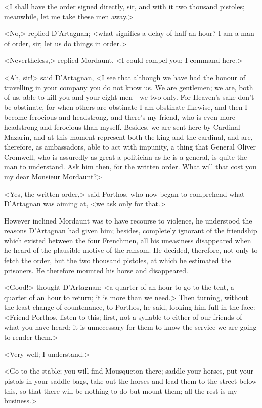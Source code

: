 <I shall have the order signed directly, sir, and with it two thousand pistoles; meanwhile, let me take these men away.>

<No,> replied D'Artagnan; <what signifies a delay of half an hour? I am a man of order, sir; let us do things in order.>

<Nevertheless,> replied Mordaunt, <I could compel you; I command here.>

<Ah, sir!> said D'Artagnan, <I see that although we have had the honour of travelling in your company you do not know us. We are gentlemen; we are, both of us, able to kill you and your eight men—we two only. For Heaven's sake don't be obstinate, for when others are obstinate I am obstinate likewise, and then I become ferocious and headstrong, and there's my friend, who is even more headstrong and ferocious than myself. Besides, we are sent here by Cardinal Mazarin, and at this moment represent both the king and the cardinal, and are, therefore, as ambassadors, able to act with impunity, a thing that General Oliver Cromwell, who is assuredly as great a politician as he is a general, is quite the man to understand. Ask him then, for the written order. What will that cost you my dear Monsieur Mordaunt?>

<Yes, the written order,> said Porthos, who now began to comprehend what D'Artagnan was aiming at, <we ask only for that.>

However inclined Mordaunt was to have recourse to violence, he understood the reasons D'Artagnan had given him; besides, completely ignorant of the friendship which existed between the four Frenchmen, all his uneasiness disappeared when he heard of the plausible motive of the ransom. He decided, therefore, not only to fetch the order, but the two thousand pistoles, at which he estimated the prisoners. He therefore mounted his horse and disappeared.

<Good!> thought D'Artagnan; <a quarter of an hour to go to the tent, a quarter of an hour to return; it is more than we need.> Then turning, without the least change of countenance, to Porthos, he said, looking him full in the face: <Friend Porthos, listen to this; first, not a syllable to either of our friends of what you have heard; it is unnecessary for them to know the service we are going to render them.>

<Very well; I understand.>

<Go to the stable; you will find Mousqueton there; saddle your horses, put your pistols in your saddle-bags, take out the horses and lead them to the street below this, so that there will be nothing to do but mount them; all the rest is my business.>

